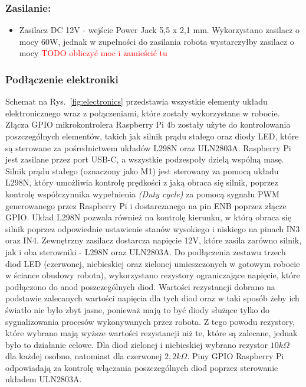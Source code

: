 \subsubsection{Zasilanie:}
\begin{itemize}
    \item Zasilacz DC 12V - wejście Power Jack 5,5 x 2,1 mm. Wykorzystano zasilacz o mocy 60W, jednak w zupełności do zasilania robota wystarczyłby zasilacz o mocy \textcolor{red}{TODO obliczyć moc i zamieścić tu}
\end{itemize}

\subsubsection{Podłączenie elektroniki}

Schemat na Rys.~\ref{fig:electronics} przedstawia wszystkie elementy układu elektronicznego wraz z połączeniami, które zostały wykorzystane w robocie.
Złącza GPIO mikrokontrolera Raspberry Pi 4b zostały użyte do kontrolowania poszczególnych elementów, takich jak silnik prądu stałego oraz diody LED, które są sterowane za 
pośrednictwem układów L298N oraz ULN2803A. Raspberry Pi jest zasilane przez port USB-C, a wszystkie podzespoły dzielą wspólną masę.
Silnik prądu stałego (oznaczony jako M1) jest sterowany za pomocą układu L298N, który umożliwia kontrolę prędkości z jaką obraca się silnik, poprzez kontrolę współczynnika wypełnienia \textit{(Duty cycle)} 
za pomocą sygnału PWM generowanego przez Raspberry Pi i dostarczanego na pin ENB poprzez złącze GPIO. Układ L298N pozwala również na kontrolę kierunku, w którą obraca się silnik poprzez
odpowiednie ustawienie stanów wysokiego i niskiego na pinach IN3 oraz IN4.
Zewnętrzny zasilacz dostarcza napięcie 12V, które zasila zarówno silnik, jak i oba sterowniki - L298N oraz ULN2803A.
Do podłączenia zestawu trzech diod LED (czerwonej, niebieskiej oraz zielonej umieszczonych w gotowym robocie w ściance obudowy robota), wykorzystano rezystory ograniczające napięcie, które podłączono 
do anod poszczególnych diod. Wartości rezystancji dobrano na podstawie zalecanych wartości napięcia dla tych diod oraz w taki sposób żeby ich światło nie było zbyt jasne, ponieważ 
mają to być diody służące tylko do sygnalizowania procesów wykonywanych przez robota. Z tego powodu rezystory, które wybrano mają wyższe wartości rezystancji niż te, które są zalecane, jednak było to
działanie celowe. Dla diod zielonej i niebieskiej wybrano rezystor $10k\Omega$ dla każdej osobno, natomiast dla czerwonej $2,2k\Omega$. Piny GPIO Raspberry Pi odpowiadają za kontrolę włączania poszczególnych diod poprzez sterowanie układem ULN2803A.
